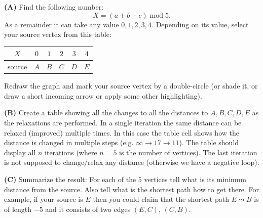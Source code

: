 \documentclass[a4paper,12pt]{article}
\begin{document}
\vspace{10pt}
{\bf (A)} Find the following number: 
$$X = (a+b+c)\;\text{mod}\;5.$$
As a remainder it can take any value $0,1,2,3,4$. 
Depending on its value, select your source vertex 
from this table: 

\vspace{5pt}
\begin{tabular}{|c|c|c|c|c|c|} \hline
$X$ & $0$ & $1$ & $2$ & $3$ & $4$ \\ \hline
source & $A$ & $B$ & $C$ & $D$ & $E$  \\ \hline
\end{tabular}

\vspace{5pt}
Redraw the graph and mark your source vertex by a 
double-circle (or shade it, or draw a short incoming arrow 
or apply some other highlighting).

\vspace{10pt}
{\bf (B)} Create a table showing all the changes 
to all the distances to $A,B,C,D,E$ as the relaxations are performed. 
In a single iteration the same distance can be relaxed (improved) multiple times. 
In this case the table cell shows how the distance is changed in multiple steps
(e.g. $\infty \rightarrow 17 \rightarrow 11$).
The table should display all $n$ iterations (where $n=5$ is the number of vertices). 
The last iteration is not supposed to change/relax any distance (otherwise 
we have a negative loop).

\vspace{10pt}
{\bf (C)} Summarize the result: For each of the $5$ vertices 
tell what is its minimum distance from the source. 
Also tell what is the shortest path how to get there. 
For example, if your source is $E$ then you
could claim that the shortest path $E \leadsto B$ is 
of length $-5$ and it consists of two edges $(E,C)$, $(C,B)$. 
\end{document}

